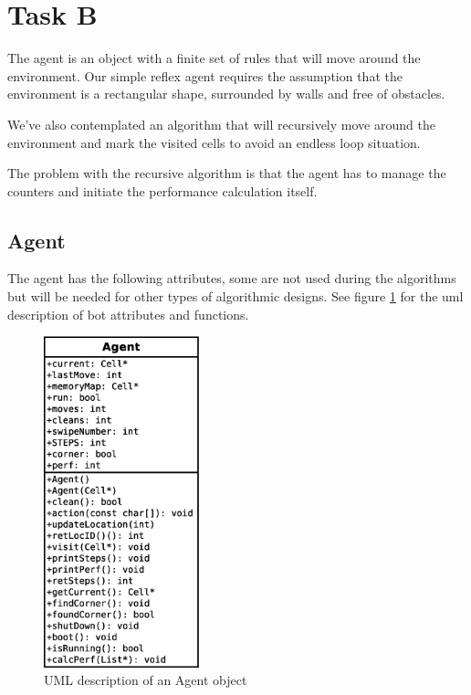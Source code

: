 
\section{Task B}
The agent is an object with a finite set of rules that will move around the
environment.  Our simple reflex agent requires the assumption that the
environment is a rectangular shape, surrounded by walls and free of obstacles.

We've also contemplated an algorithm that will recursively move around the
environment and mark the visited cells to avoid an endless loop situation.

The problem with the recursive algorithm is that the agent has to manage the
counters and initiate the performance calculation itself.

\subsection{Agent}
The agent has the following attributes, some are not used during the algorithms
but will be needed for other types of algorithmic designs. See figure
\ref{fig:agent_uml} for the uml description of bot attributes and functions.

\begin{figure}[h] \label{fig:agent_uml}	\centering
\includegraphics[width=0.4\textwidth]{agent_um}
\caption{UML description of an Agent object}
\end{figure}

